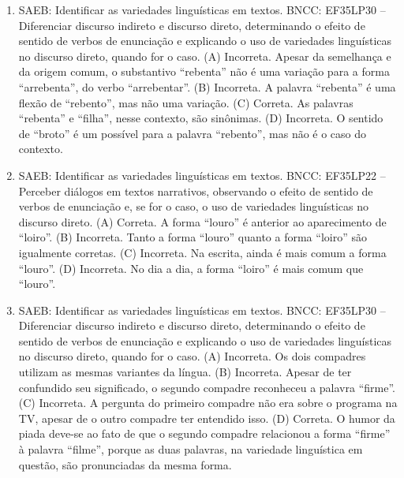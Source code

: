 \begin{enumerate}
\item
SAEB: Identificar as variedades linguísticas em textos.
BNCC: EF35LP30 -- Diferenciar discurso indireto e discurso direto,
determinando o efeito de sentido de verbos de enunciação e explicando o
uso de variedades linguísticas no discurso direto, quando for o caso.
(A) Incorreta. Apesar da semelhança e da origem comum, o substantivo ``rebenta'' não é uma variação para a forma ``arrebenta'', do verbo ``arrebentar''.
(B) Incorreta. A palavra ``rebenta'' é uma flexão de ``rebento'', mas não uma variação.
(C) Correta. As palavras ``rebenta'' e ``filha'', nesse contexto, são sinônimas.
(D) Incorreta. O sentido de ``broto'' é um possível para a palavra ``rebento'', mas não é o caso do contexto.

\item
SAEB: Identificar as variedades linguísticas em textos.
BNCC: EF35LP22 -- Perceber diálogos em textos narrativos, observando o
efeito de sentido de verbos de enunciação e, se for o caso, o uso de
variedades linguísticas no discurso direto.
(A) Correta. A forma ``louro'' é anterior ao aparecimento de ``loiro''.
(B) Incorreta. Tanto a forma ``louro'' quanto a forma ``loiro'' são igualmente corretas.
(C) Incorreta. Na escrita, ainda é mais comum a forma ``louro''.
(D) Incorreta. No dia a dia, a forma ``loiro'' é mais comum que ``louro''.

\item
SAEB: Identificar as variedades linguísticas em textos.
BNCC: EF35LP30 -- Diferenciar discurso indireto e discurso direto,
determinando o efeito de sentido de verbos de enunciação e explicando o
uso de variedades linguísticas no discurso direto, quando for o caso.
(A) Incorreta. Os dois compadres utilizam as mesmas variantes da língua.
(B) Incorreta. Apesar de ter confundido seu significado, o segundo compadre reconheceu a palavra ``firme''.
(C) Incorreta. A pergunta do primeiro compadre não era sobre o programa na TV, apesar de o outro compadre ter entendido isso.
(D) Correta. O humor da piada deve-se ao fato de que o segundo compadre relacionou a forma ``firme'' à palavra ``filme'', porque as duas palavras, na variedade linguística em questão, são pronunciadas da mesma forma.
\end{enumerate}


